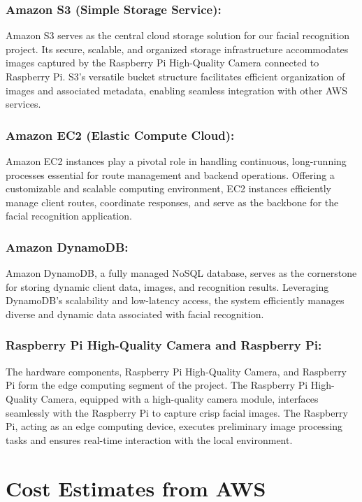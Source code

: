 \documentclass[11pt]{article}
\begin{document}
\subsubsection{Amazon S3 (Simple Storage Service):}
Amazon S3 serves as the central cloud storage solution for our facial recognition project. Its secure, scalable, and organized storage infrastructure accommodates images captured by the Raspberry Pi High-Quality Camera connected to Raspberry Pi. S3's versatile bucket structure facilitates efficient organization of images and associated metadata, enabling seamless integration with other AWS services.

\subsubsection{Amazon EC2 (Elastic Compute Cloud):}
Amazon EC2 instances play a pivotal role in handling continuous, long-running processes essential for route management and backend operations. Offering a customizable and scalable computing environment, EC2 instances efficiently manage client routes, coordinate responses, and serve as the backbone for the facial recognition application.

\subsubsection{Amazon DynamoDB:}
Amazon DynamoDB, a fully managed NoSQL database, serves as the cornerstone for storing dynamic client data, images, and recognition results. Leveraging DynamoDB's scalability and low-latency access, the system efficiently manages diverse and dynamic data associated with facial recognition.

\subsubsection{Raspberry Pi High-Quality Camera and Raspberry Pi:}
The hardware components, Raspberry Pi High-Quality Camera, and Raspberry Pi form the edge computing segment of the project. The Raspberry Pi High-Quality Camera, equipped with a high-quality camera module, interfaces seamlessly with the Raspberry Pi to capture crisp facial images. The Raspberry Pi, acting as an edge computing device, executes preliminary image processing tasks and ensures real-time interaction with the local environment.

\section{Cost Estimates from AWS}
\end{document}
